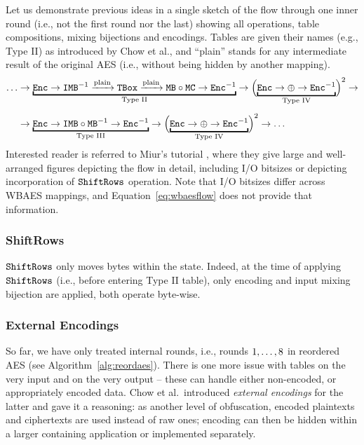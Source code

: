 	Let us demonstrate previous ideas in a single sketch of the flow through one inner round (i.e., not the first round nor the last) showing all operations, table compositions, mixing bijections and encodings. Tables are given their names (e.g., Type II) as introduced by Chow et al., and ``plain'' stands for any intermediate result of the original AES (i.e., without being hidden by another mapping).
	\begin{align}
	\label{eq:wbaesflow}
		\ldots&\rarr\underbracket{\Enc\rarr\IMB^{-1}\xrightarrow{\textnormal{plain}}\TBox\xrightarrow{\textnormal{plain}}\MB\circ\MC\rarr\Enc^{-1}}_{\textnormal{Type II}}\rarr\Bigl(\underbracket{\Enc\rarr\xor\rarr\Enc^{-1}}_{\textnormal{Type IV}}\Bigr)^2\rarr\nonumber\\[.5em]
		&\rarr\underbracket{\Enc\rarr\IMB\circ\MB^{-1}\rarr\Enc^{-1}}_{\textnormal{Type III}}\rarr\Bigl(\underbracket{\Enc\rarr\xor\rarr\Enc^{-1}}_{\textnormal{Type IV}}\Bigr)^2\rarr\ldots
	\end{align}
	Interested reader is referred to Miur's tutorial \cite{muir2013tutorial}, where they give large and well-arranged figures depicting the flow in detail, including I/O bitsizes or depicting incorporation of $\texttt{ShiftRows}$ operation. Note that I/O bitsizes differ across WBAES mappings, and Equation~\ref{eq:wbaesflow} does not provide that information.
	
\subsubsection{ShiftRows}
	
	$\texttt{ShiftRows}$ only moves bytes within the state. Indeed, at the time of applying $\texttt{ShiftRows}$ (i.e., before entering Type II table), only encoding and input mixing bijection are applied, both operate byte-wise.

\subsubsection{External Encodings}
	
	So far, we have only treated internal rounds, i.e., rounds $1 , \ldots , 8$ in reordered AES (see Algorithm~\ref{alg:reordaes}). There is one more issue with tables on the very input and on the very output -- these can handle either non-encoded, or appropriately encoded data. Chow et al.\ introduced {\em external encodings} for the latter and gave it a reasoning: as another level of obfuscation, encoded plaintexts and ciphertexts are used instead of raw ones; encoding can then be hidden within a larger containing application or implemented separately.
	
